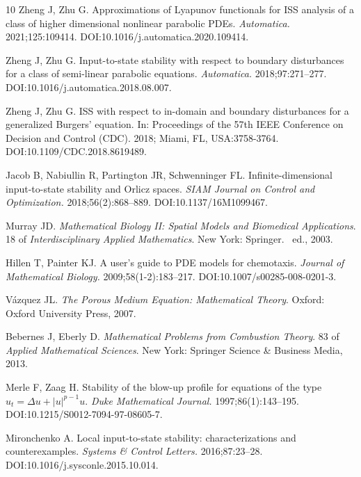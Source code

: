 \documentclass[onecolumn]{autart}
\newenvironment{proof of Prop.ODE}{{\it Proof of Proposition~\ref{Prop.ODE}:\enspace}}{\hfill $\blacksquare$\par}
\newenvironment{proof of PDE}{{\it Proof of Proposition \ref{Prop.8}:\enspace}}{\hfill $\blacksquare$\par}
\begin{document}
{{\begin{thebibliography}{10}
	Zheng J, Zhu G. Approximations of {{L}}yapunov functionals for {{ISS}} analysis
	of a class of higher dimensional nonlinear parabolic {{PDE}}s. {\it
		Automatica.} 2021\string;125\string:109414.
	\newblock DOI:10.1016/j.automatica.2020.109414.
	
	Zheng J, Zhu G. Input-to-state stability with respect to boundary disturbances
	for a class of semi-linear parabolic equations. {\it Automatica.}
	2018\string;97\string:271--277.
	\newblock DOI:10.1016/j.automatica.2018.08.007.
	
	Zheng J, Zhu G. {ISS} with respect to in-domain and boundary disturbances for a
	generalized {Burgers'} equation. In: Proceedings of the 57th IEEE Conference
	on Decision and Control (CDC).  2018; Miami, FL, USA\string:3758-3764.
	\newblock DOI:10.1109/CDC.2018.8619489.
	
	Jacob B, Nabiullin R, Partington JR, Schwenninger FL. Infinite-dimensional
	input-to-state stability and Orlicz spaces. {\it SIAM Journal on Control and
		Optimization.} 2018\string;56(2)\string:868--889.
	\newblock DOI:10.1137/16M1099467.
	
	Murray JD. {\it Mathematical Biology {II}: Spatial Models and Biomedical
		Applications}. 18 of {\it Interdisciplinary Applied Mathematics}.
	\newblock New York: Springer.
	~ed., 2003.
	
	Hillen T, Painter KJ. A user's guide to {PDE} models for chemotaxis. {\it
		Journal of Mathematical Biology.} 2009\string;58(1-2)\string:183--217.
	\newblock DOI:10.1007/s00285-008-0201-3.
	
	V{\'a}zquez JL. {\it The Porous Medium Equation: Mathematical Theory}.
	\newblock Oxford: Oxford University Press, 2007.
	
	Bebernes J, Eberly D. {\it Mathematical Problems from Combustion Theory}. 83 of
	{\it Applied Mathematical Sciences}.
	\newblock New York: Springer Science \& Business Media, 2013.
	
	Merle F, Zaag H. Stability of the blow-up profile for equations of the type
	$u_t = \Delta u + |u|^{p-1}u$. {\it Duke Mathematical Journal.}
	1997\string;86(1)\string:143--195.
	\newblock DOI:10.1215/S0012-7094-97-08605-7.
	
	Mironchenko A. Local input-to-state stability: characterizations and
	counterexamples. {\it Systems \& Control Letters.}
	2016\string;87\string:23--28.
	\newblock DOI:10.1016/j.sysconle.2015.10.014.
	

\end{thebibliography}}}
\end{document}
